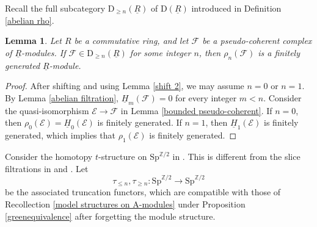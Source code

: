 \documentclass[10pt]{amsart}
\newtheorem{lem}[thm]{Lemma}
\theoremstyle{definition}
\numberwithin{equation}{section}
\newcommand{\Z}{\mathbb{Z}}
\newcommand{\cE}{\mathcal{E}}
\newcommand{\cF}{\mathcal{F}}
\newcommand{\rD}{\mathrm{D}}
\newcommand{\ul}{\underline}
\newcommand{\Sp}{\mathrm{Sp}}
\begin{document}
Recall the full subcategory $\rD_{\geq n}(\ul{R})$ of $\rD(\ul{R})$ introduced in Definition \ref{abelian rho}.

\begin{lem}
\label{lem:pseudo-coherence and finitely generated}
Let $R$ be a commutative ring,
and let $\cF$ be a pseudo-coherent complex of $\ul{R}$-modules.
If $\cF\in \rD_{\geq n}(\ul{R})$ for some integer $n$,
then $\rho_n(\cF)$ is a finitely generated $\ul{R}$-module.
\end{lem}
\begin{proof}
After shifting and using Lemma \ref{shift 2},
we may assume $n=0$ or $n=1$.
By Lemma \ref{abelian filtration},
$\ul{H}_m(\cF)=0$ for every integer $m<n$.
Consider the quasi-isomorphism $\cE\to \cF$ in Lemma \ref{bounded pseudo-coherent}.
If $n=0$, then $\rho_0(\cE)=\ul{H}_0(\cE)$ is finitely generated.
If $n=1$, then $\ul{H}_1(\cE)$ is finitely generated, which implies that $\rho_1(\cE)$ is finitely generated.
\end{proof}


Consider the homotopy $t$-structure on $\Sp^{\Z/2}$ in \cite[Proposition A.3.4]{HP23}.
This is different from the slice filtrations in \cite{HHR} and \cite{HHR21}.
Let
\[
\tau_{\leq n},\tau_{\geq n}\colon \Sp^{\Z/2}\to \Sp^{\Z/2}
\]
be the associated truncation functors,
which are compatible with those of Recollection
\ref{model structures on A-modules} under Proposition \ref{greenequivalence} after forgetting the module structure.
\end{document}
